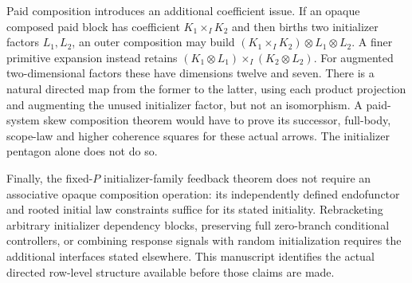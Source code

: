 \documentclass[11pt]{article}
\begin{document}
Paid composition introduces an additional coefficient issue. If an opaque composed paid block has coefficient $K_1\times_I K_2$ and then births two initializer factors $L_1,L_2$, an outer composition may build $(K_1\times_I K_2)\otimes L_1\otimes L_2$. A finer primitive expansion instead retains $(K_1\otimes L_1)\times_I(K_2\otimes L_2)$. For augmented two-dimensional factors these have dimensions twelve and seven. There is a natural directed map from the former to the latter, using each product projection and augmenting the unused initializer factor, but not an isomorphism. A paid-system skew composition theorem would have to prove its successor, full-body, scope-law and higher coherence squares for these actual arrows. The initializer pentagon alone does not do so.

Finally, the fixed-$P$ initializer-family feedback theorem does not require an associative opaque composition operation: its independently defined endofunctor and rooted initial law constraints suffice for its stated initiality. Rebracketing arbitrary initializer dependency blocks, preserving full zero-branch conditional controllers, or combining response signals with random initialization requires the additional interfaces stated elsewhere. This manuscript identifies the actual directed row-level structure available before those claims are made.
\end{document}
